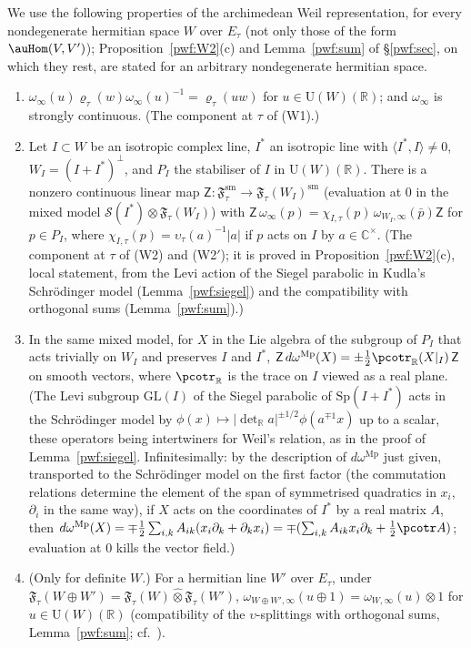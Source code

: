 \documentclass[10pt]{amsart}
\theoremstyle{definition}
\theoremstyle{remark}
\newcommand{\C}{\mathbb C}
\newcommand{\R}{\mathbb R}
\providecommand{\auU}{\mathrm U}
\begin{document}
We use the following properties of the archimedean Weil representation, for every nondegenerate
hermitian space $W$ over $E_\tau$ (not only those of the form $\auHom(V,V')$); Proposition~\ref{pwf:W2}(c) and Lemma~\ref{pwf:sum} of \S\ref{pwf:sec}, on which they rest, are
stated for an arbitrary nondegenerate hermitian space.
\begin{enumerate}
\item[(W1$_\infty$)] $\omega_\infty(u)\varrho_\tau(w)\omega_\infty(u)^{-1}=\varrho_\tau(uw)$ for
$u\in\auU(W)(\R)$; and $\omega_\infty$ is strongly continuous. (The component at $\tau$ of (W1).)
\item[(W2$_\infty$)] Let $I\subset W$ be an isotropic complex line, $I^*$ an isotropic line with
$\langle I^*,I\rangle\ne0$, $W_I=(I+I^*)^\perp$, and $P_I$ the stabiliser of $I$ in $\auU(W)(\R)$.
There is a nonzero continuous linear map $\mathsf Z\colon\mathfrak F_\tau^{\mathrm{sm}}\to
\mathfrak F_\tau(W_I)^{\mathrm{sm}}$ (evaluation at $0$ in the mixed model $\mathcal S(I^*)\otimes
\mathfrak F_\tau(W_I)$) with $\mathsf Z\,\omega_\infty(p)=\chi_{I,\tau}(p)\,\omega_{W_I,\infty}(\bar p)
\mathsf Z$ for $p\in P_I$, where $\chi_{I,\tau}(p)=\upsilon_\tau(a)^{-1}|a|$ if $p$ acts on $I$ by
$a\in\C^\times$. (The component at $\tau$ of (W2) and (W2$'$); it is proved in
Proposition~\ref{pwf:W2}(c), local statement, from the Levi action of the Siegel parabolic in
Kudla's Schr\"odinger model \cite[Theorem~3.1 and \S5]{KudlaSplitting} (Lemma~\ref{pwf:siegel}) and
the compatibility with orthogonal sums (Lemma~\ref{pwf:sum}).)
\item[(M)] In the same mixed model, for $X$ in the Lie algebra of the subgroup of $P_I$ that acts
trivially on $W_I$ and preserves $I$ and $I^*$, $\mathsf Z\,d\omega^{\mathrm{Mp}}(X)=\pm\frac12
\pcotr_\R(X|_{I})\,\mathsf Z$ on smooth vectors, where $\pcotr_\R$ is the trace on $I$ viewed as a
real plane. (The Levi subgroup $\mathrm{GL}(I)$ of the Siegel parabolic of $\mathrm{Sp}(I+I^*)$ acts in
the Schr\"odinger model by $\phi(x)\mapsto|\det_\R a|^{\pm1/2}\phi(a^{\mp1}x)$ up to a scalar, these operators being intertwiners for Weil's relation, as in the proof of Lemma~\ref{pwf:siegel}. Infinitesimally: by the description of $d\omega^{\mathrm{Mp}}$ just given, transported to the Schr\"odinger model on the first factor (the commutation relations determine the element of the span of symmetrised quadratics in $x_i$, $\partial_i$ in the same way), if $X$ acts on the coordinates of $I^*$ by a real matrix $A$, then $d\omega^{\mathrm{Mp}}(X)=\mp\frac12\sum_{i,k}A_{ik}(x_i\partial_k+\partial_kx_i)=\mp(\sum_{i,k}A_{ik}x_i\partial_k+\frac12\pcotr A)$; evaluation at $0$ kills the vector field.)
\item[(S)] (Only for definite $W$.) For a hermitian line $W'$ over $E_\tau$, under
$\mathfrak F_\tau(W\oplus W')=\mathfrak F_\tau(W)\hat\otimes\mathfrak F_\tau(W')$,
$\omega_{W\oplus W',\infty}(u\oplus1)=\omega_{W,\infty}(u)\otimes1$ for $u\in\auU(W)(\R)$
(compatibility of the $\upsilon$-splittings with orthogonal sums, Lemma~\ref{pwf:sum}; cf.\ \cite[p.~389]{KudlaSplitting}).
\end{enumerate}
\end{document}
